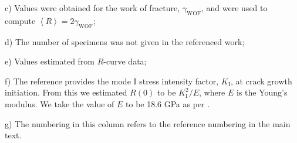 \documentclass[12pt,onecolumn]{article}
\begin{document}
\begin{bibunit}
\begin{table}[H]
\begin{threeparttable}[t]
\begin{tablenotes}
{\item[c)] Values were obtained for the work of fracture, $\gamma_\mathrm{WOF}$, and were used to compute $\left< R\right>=2\gamma_\mathrm{WOF}$;
\item[d)] The number of specimens was not given in the referenced work;
\item[e)] Values estimated from $R$-curve data;
\item[f)] The reference provides the mode I stress intensity factor, $K_\mathrm{I}$, at crack growth initiation. From this we estimated $R(0)$ to be $K_\mathrm{I}^2/E$, where $E$ is the Young's modulus. We take the value of $E$ to be 18.6 GPa as per \cite{rho1993young}.
\item[g)] The numbering in this column refers to the reference numbering in the main text.
}
\end{tablenotes}
\end{threeparttable}
\end{table}

\clearpage
\thispagestyle{empty}


\end{bibunit}
\end{document}
